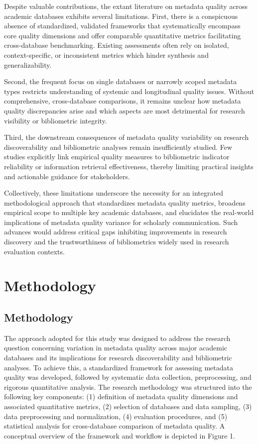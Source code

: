 \documentclass[
  12pt,
]{article}
\begin{document}
Despite valuable contributions, the extant literature on metadata
quality across academic databases exhibits several limitations. First,
there is a conspicuous absence of standardized, validated frameworks
that systematically encompass core quality dimensions and offer
comparable quantitative metrics facilitating cross-database
benchmarking. Existing assessments often rely on isolated,
context-specific, or inconsistent metrics which hinder synthesis and
generalizability.

Second, the frequent focus on single databases or narrowly scoped
metadata types restricts understanding of systemic and longitudinal
quality issues. Without comprehensive, cross-database comparisons, it
remains unclear how metadata quality discrepancies arise and which
aspects are most detrimental for research visibility or bibliometric
integrity.

Third, the downstream consequences of metadata quality variability on
research discoverability and bibliometric analyses remain insufficiently
studied. Few studies explicitly link empirical quality measures to
bibliometric indicator reliability or information retrieval
effectiveness, thereby limiting practical insights and actionable
guidance for stakeholders.

Collectively, these limitations underscore the necessity for an
integrated methodological approach that standardizes metadata quality
metrics, broadens empirical scope to multiple key academic databases,
and elucidates the real-world implications of metadata quality variance
for scholarly communication. Such advances would address critical gaps
inhibiting improvements in research discovery and the trustworthiness of
bibliometrics widely used in research evaluation contexts.

\section{Methodology}\label{methodology}

\subsection{Methodology}\label{methodology-1}

The approach adopted for this study was designed to address the research
question concerning variation in metadata quality across major academic
databases and its implications for research discoverability and
bibliometric analyses. To achieve this, a standardized framework for
assessing metadata quality was developed, followed by systematic data
collection, preprocessing, and rigorous quantitative analysis. The
research methodology was structured into the following key components:
(1) definition of metadata quality dimensions and associated
quantitative metrics, (2) selection of databases and data sampling, (3)
data preprocessing and normalization, (4) evaluation procedures, and (5)
statistical analysis for cross-database comparison of metadata quality.
A conceptual overview of the framework and workflow is depicted in
Figure 1.
\end{document}
